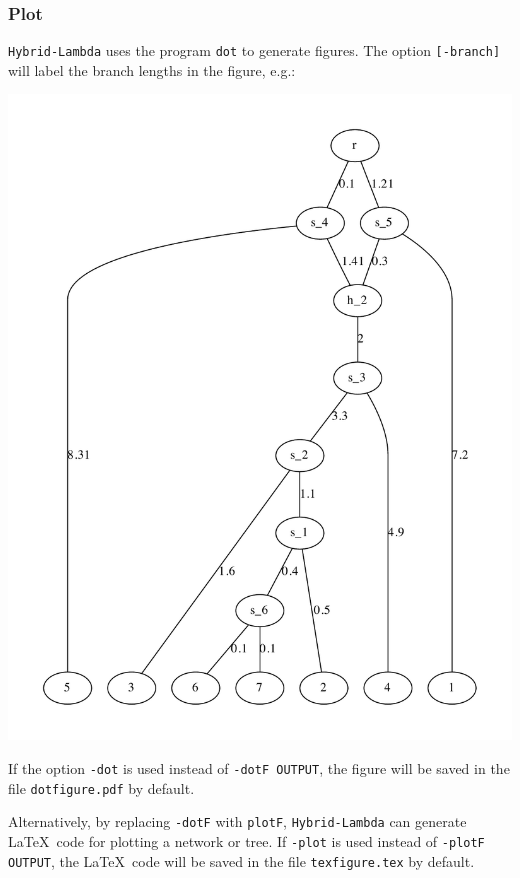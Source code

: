 \subsubsection{Plot}
{\tt Hybrid-Lambda} uses the program {\tt dot} to generate figures. The option {\tt [-branch]} will label the branch lengths in the figure, e.g.:
\begin{center}
\includegraphics[width=.8\textwidth]{branch.pdf}
\end{center}
If the option {\tt -dot} is used instead of {\tt -dotF OUTPUT}, the figure will be saved in the file {\tt dotfigure.pdf} by default.

Alternatively, by replacing {\tt -dotF} with {\tt plotF}, {\tt Hybrid-Lambda} can generate \LaTeX\ code for plotting a network or tree.
If {\tt -plot} is used instead of {\tt -plotF OUTPUT}, the \LaTeX\ code will be saved in the file {\tt texfigure.tex} by default.

